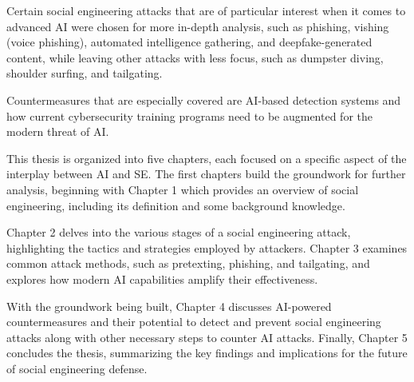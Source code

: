 Certain social engineering attacks that are of particular interest when it comes to advanced AI were chosen for more in-depth analysis, such as phishing, vishing (voice phishing), automated intelligence gathering, and deepfake-generated content, while leaving other attacks with less focus, such as dumpster diving, shoulder surfing, and tailgating.

Countermeasures that are especially covered are AI-based detection systems and how current cybersecurity training programs need to be augmented for the modern threat of AI.


This thesis is organized into five chapters, each focused on a specific aspect of the interplay between AI and SE. The first chapters build the groundwork for further analysis, beginning with Chapter 1 which provides an overview of social engineering, including its definition and some background knowledge.

Chapter 2 delves into the various stages of a social engineering attack, highlighting the tactics and strategies employed by attackers. Chapter 3 examines common attack methods, such as pretexting, phishing, and tailgating, and explores how modern AI capabilities amplify their effectiveness.

With the groundwork being built, Chapter 4 discusses AI-powered countermeasures and their potential to detect and prevent social engineering attacks along with other necessary steps to counter AI attacks. Finally, Chapter 5 concludes the thesis, summarizing the key findings and implications for the future of social engineering defense.




